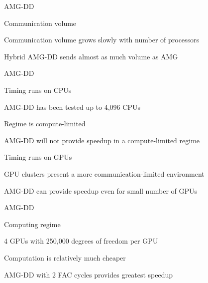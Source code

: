 \documentclass[18pt,xcolor=table]{beamer}
\begin{document}
\begin{frame}{AMG-DD}
\begin{block}{Communication volume}
\bit
\item Communication volume grows  slowly with number of processors
\item Hybrid AMG-DD sends almost as much volume as AMG 
\eit
\end{block}
\centering
\vspace{0.5 cm}
\end{frame}

\begin{frame}{AMG-DD}
\begin{block}{Timing runs on CPUs}
\bit
\item AMG-DD has been tested up to 4,096 CPUs
\item Regime is compute-limited
\item AMG-DD will not provide speedup in a compute-limited regime
\eit
\end{block}
\begin{block}{Timing runs on GPUs}
\bit
\item GPU clusters present a more communication-limited environment
\item AMG-DD can provide speedup even for small number of GPUs
\eit
\end{block}
\end{frame}

\begin{frame}{AMG-DD}
\begin{block}{Computing regime}
\bit
\item 4 GPUs with 250,000 degrees of freedom per GPU
   \item Computation is relatively much cheaper
   \item AMG-DD with 2 FAC cycles provides greatest speedup
\eit
\end{block}
\centering
\vspace{0.5 cm}
\end{frame}
\end{document}

